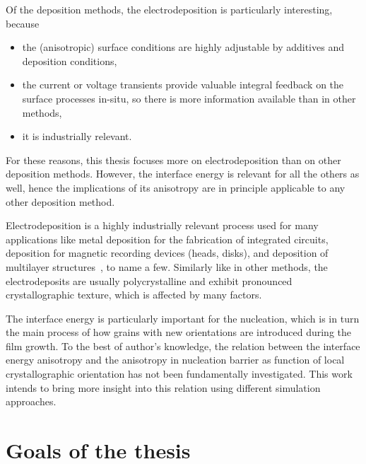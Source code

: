 Of the deposition methods, the electrodeposition is particularly interesting, because
\begin{itemize}
	\item the (anisotropic) surface conditions are highly adjustable by additives and deposition conditions,
	\item the current or voltage transients provide valuable integral feedback on the surface processes in-situ, so there is more information available than in other methods,
	\item it is industrially relevant.
\end{itemize}
For these reasons, this thesis focuses more on electrodeposition than on other deposition methods. However, the interface energy is relevant for all the others as well, hence the implications of its anisotropy are in principle applicable to any other deposition method. 

Electrodeposition is a highly industrially relevant process used for many applications like metal deposition for the fabrication of integrated circuits, deposition for magnetic recording devices (heads, disks), and deposition
of multilayer structures~\cite{Schlesinger2006}, to name a few. Similarly like in other methods, the electrodeposits are usually polycrystalline and exhibit pronounced crystallographic texture, which is affected by many factors. 

The interface energy is particularly important for the nucleation, which is in turn the main process of how grains with new orientations are introduced during the film growth. To the best of author's knowledge, the relation between the interface energy anisotropy and the anisotropy in nucleation barrier as function of local crystallographic orientation has not been fundamentally investigated. This work intends to bring more insight into this relation using different simulation approaches.




\section{Goals of the thesis}

